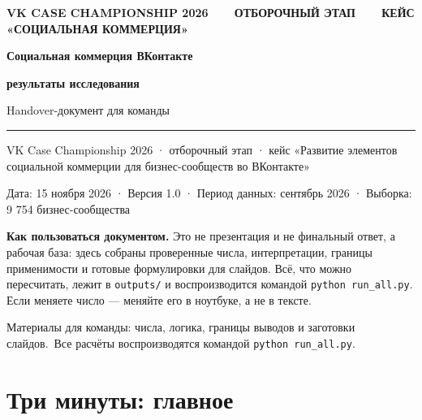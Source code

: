 \documentclass[10pt,a4paper]{article}
\begin{document}
\begin{titlepage}
\thispagestyle{empty}
\noindent\colorbox{vk}{\parbox{\dimexpr\linewidth-2\fboxsep}{
\color{white}\small\bfseries VK CASE CHAMPIONSHIP 2026\ \ \textbullet\ \ ОТБОРОЧНЫЙ ЭТАП\ \ \textbullet\ \ КЕЙС «СОЦИАЛЬНАЯ КОММЕРЦИЯ»}}\par
\vspace*{56pt}
{\raggedright\fontsize{26}{31}\selectfont\bfseries\color{navy}Социальная коммерция ВКонтакте\par}
\vspace{2pt}
{\raggedright\fontsize{21}{26}\selectfont\bfseries\color{blue}результаты исследования\par}
\vspace{16pt}
{\Large\color{grey}Handover-документ для команды\par}
\vspace{30pt}
{\color{light}\rule{\linewidth}{1.2pt}}\par
\vspace{12pt}
{\small\color{dark}\raggedright VK Case Championship 2026 · отборочный этап · кейс «Развитие элементов социальной коммерции для бизнес-сообществ во ВКонтакте»\par}
{\small\color{dark}\raggedright Дата: 15 ноября 2026 · Версия 1.0 · Период данных: сентябрь 2026 · Выборка: 9 754 бизнес-сообщества\par}
\vspace{18pt}
\noindent\colorbox{soft}{\parbox{\dimexpr\linewidth-2\fboxsep}{
\raggedright\color{navy}\textbf{Как пользоваться документом.} Это не презентация и не финальный ответ, а рабочая база: здесь собраны проверенные числа, интерпретации, границы применимости и готовые формулировки для слайдов. Всё, что можно пересчитать, лежит в \texttt{outputs/} и воспроизводится командой \texttt{python run\_all.py}. Если меняете число — меняйте его в ноутбуке, а не в тексте.
}}
\vfill
{\footnotesize\color{grey}Материалы для команды: числа, логика, границы выводов и заготовки слайдов.\ Все расчёты воспроизводятся командой \texttt{python run\_all.py}.\par}
\end{titlepage}

\setcounter{page}{2}

\clearpage

{\small

\tableofcontents

}

\clearpage

\section{Три минуты: главное}
\end{document}
